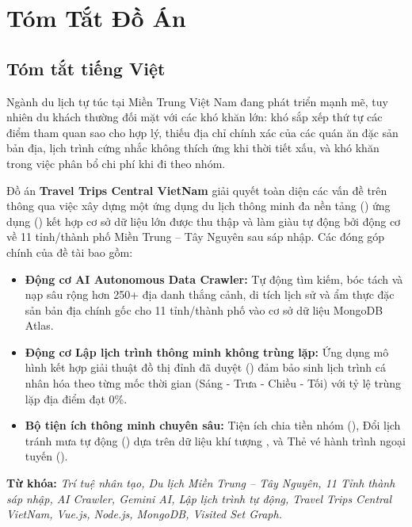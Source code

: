 \chapter*{Tóm Tắt Đồ Án}

\section*{Tóm tắt tiếng Việt}
Ngành du lịch tự túc tại Miền Trung Việt Nam đang phát triển mạnh mẽ, tuy nhiên du khách thường đối mặt với các khó khăn lớn: khó sắp xếp thứ tự các điểm tham quan sao cho hợp lý, thiếu địa chỉ chính xác của các quán ăn đặc sản bản địa, lịch trình cứng nhắc không thích ứng khi thời tiết xấu, và khó khăn trong việc phân bổ chi phí khi đi theo nhóm.

Đồ án \textbf{Travel Trips Central VietNam} giải quyết toàn diện các vấn đề trên thông qua việc xây dựng một ứng dụng du lịch thông minh đa nền tảng () ứng dụng  () kết hợp cơ sở dữ liệu lớn được thu thập và làm giàu tự động bởi động cơ  về 11 tỉnh/thành phố Miền Trung -- Tây Nguyên sau sáp nhập. Các đóng góp chính của đề tài bao gồm:
\begin{itemize}
    \item \textbf{Động cơ AI Autonomous Data Crawler:} Tự động tìm kiếm, bóc tách và nạp sâu rộng hơn 250+ địa danh thắng cảnh, di tích lịch sử và ẩm thực đặc sản bản địa chính gốc cho 11 tỉnh/thành phố vào cơ sở dữ liệu MongoDB Atlas.
    \item \textbf{Động cơ Lập lịch trình thông minh không trùng lặp:} Ứng dụng mô hình  kết hợp giải thuật đồ thị đỉnh đã duyệt () đảm bảo sinh lịch trình cá nhân hóa theo từng mốc thời gian (Sáng - Trưa - Chiều - Tối) với tỷ lệ trùng lặp địa điểm đạt 0\%.
    \item \textbf{Bộ tiện ích thông minh chuyên sâu:} Tiện ích chia tiền nhóm (), Đổi lịch tránh mưa tự động () dựa trên dữ liệu khí tượng , và Thẻ vé hành trình ngoại tuyến ().
\end{itemize}

\textbf{Từ khóa:} \textit{Trí tuệ nhân tạo, Du lịch Miền Trung -- Tây Nguyên, 11 Tỉnh thành sáp nhập, AI Crawler, Gemini AI, Lập lịch trình tự động, Travel Trips Central VietNam, Vue.js, Node.js, MongoDB, Visited Set Graph.}

